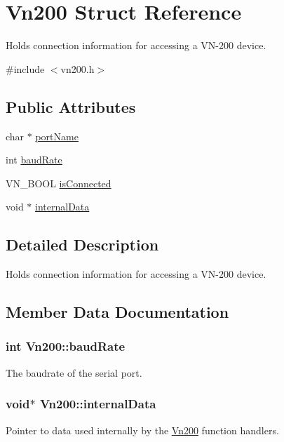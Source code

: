 \hypertarget{structVn200}{}\section{Vn200 Struct Reference}
\label{structVn200}


Holds connection information for accessing a V\+N-\/200 device.  




{\ttfamily \#include $<$vn200.\+h$>$}

\subsection*{Public Attributes}
\begin{DoxyCompactItemize}
\item 
char $\ast$ \hyperlink{structVn200_a1551fb183b0cbdde3d4ba81d60fd8a89}{port\+Name}
\item 
int \hyperlink{structVn200_a4230af77b3f00d6dcab5af206933db71}{baud\+Rate}
\item 
V\+N\+\_\+\+B\+O\+OL \hyperlink{structVn200_aa6d2a99cef4b62e9ab36a9efa1eeb34a}{is\+Connected}
\item 
void $\ast$ \hyperlink{structVn200_adf27ac2f5f245783cd7997d1553f3686}{internal\+Data}
\end{DoxyCompactItemize}


\subsection{Detailed Description}
Holds connection information for accessing a V\+N-\/200 device. 

\subsection{Member Data Documentation}
\subsubsection[{\texorpdfstring{baud\+Rate}{baudRate}}]{\setlength{\rightskip}{0pt plus 5cm}int Vn200\+::baud\+Rate}\hypertarget{structVn200_a4230af77b3f00d6dcab5af206933db71}{}\label{structVn200_a4230af77b3f00d6dcab5af206933db71}
The baudrate of the serial port. 
\subsubsection[{\texorpdfstring{internal\+Data}{internalData}}]{\setlength{\rightskip}{0pt plus 5cm}void$\ast$ Vn200\+::internal\+Data}\hypertarget{structVn200_adf27ac2f5f245783cd7997d1553f3686}{}\label{structVn200_adf27ac2f5f245783cd7997d1553f3686}
Pointer to data used internally by the \hyperlink{structVn200}{Vn200} function handlers. 
